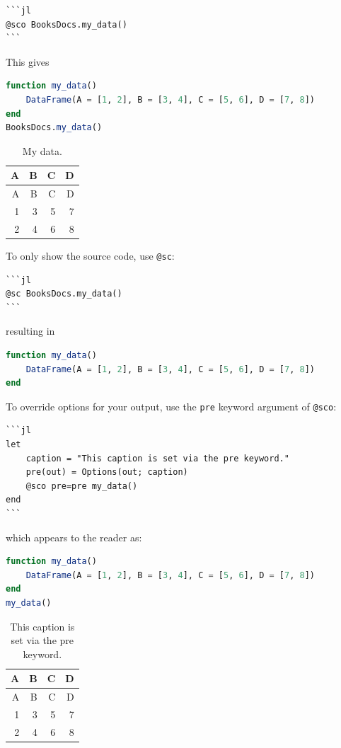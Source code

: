 \documentclass[
  notoc %
]{tufte-book}
\newcommand{\passthrough}[1]{#1}
\begin{document}
\begin{lstlisting}
```jl
@sco BooksDocs.my_data()
```
\end{lstlisting}

This gives

\begin{lstlisting}[language=Julia]
function my_data()
    DataFrame(A = [1, 2], B = [3, 4], C = [5, 6], D = [7, 8])
end
BooksDocs.my_data()
\end{lstlisting}

\hypertarget{tbl:my_data}{}
\begin{longtable}[]{@{}rrrr@{}}
\caption{\label{tbl:my_data}My data.}\tabularnewline
\toprule()
A & B & C & D \\
\midrule()
\endfirsthead
\toprule()
A & B & C & D \\
\midrule()
\endhead
1 & 3 & 5 & 7 \\
2 & 4 & 6 & 8 \\
\bottomrule()
\end{longtable}

To only show the source code, use \passthrough{\lstinline!@sc!}:

\begin{lstlisting}
```jl
@sc BooksDocs.my_data()
```
\end{lstlisting}

resulting in

\begin{lstlisting}[language=Julia]
function my_data()
    DataFrame(A = [1, 2], B = [3, 4], C = [5, 6], D = [7, 8])
end
\end{lstlisting}

To override options for your output, use the
\passthrough{\lstinline!pre!} keyword argument of
\passthrough{\lstinline!@sco!}:

\begin{lstlisting}
```jl
let
    caption = "This caption is set via the pre keyword."
    pre(out) = Options(out; caption)
    @sco pre=pre my_data()
end
```
\end{lstlisting}

which appears to the reader as:

\begin{lstlisting}[language=Julia]
function my_data()
    DataFrame(A = [1, 2], B = [3, 4], C = [5, 6], D = [7, 8])
end
my_data()
\end{lstlisting}

\begin{longtable}[]{@{}rrrr@{}}
\caption{This caption is set via the pre keyword.}\tabularnewline
\toprule()
A & B & C & D \\
\midrule()
\endfirsthead
\toprule()
A & B & C & D \\
\midrule()
\endhead
1 & 3 & 5 & 7 \\
2 & 4 & 6 & 8 \\
\bottomrule()
\end{longtable}
\end{document}
